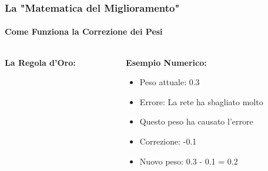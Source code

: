\documentclass[aspectratio=169]{beamer}
\begin{document}
\begin{frame}
\frametitle{La "Matematica del Miglioramento"}
\framesubtitle{Come Funziona la Correzione dei Pesi}

\begin{columns}
\begin{column}{0.5\textwidth}

\vspace{0.3cm}
\textbf{La Regola d'Oro:}
\begin{center}
\end{center}
\end{column}

\begin{column}{0.5\textwidth}
\textbf{Esempio Numerico:}
\begin{itemize}
    \item Peso attuale: 0.3
    \item Errore: La rete ha sbagliato molto
    \item Questo peso ha causato l'errore
    \item Correzione: -0.1
    \item Nuovo peso: 0.3 - 0.1 = 0.2
\end{itemize}
\end{column}
\end{columns}

\end{frame}
%
\end{document}
